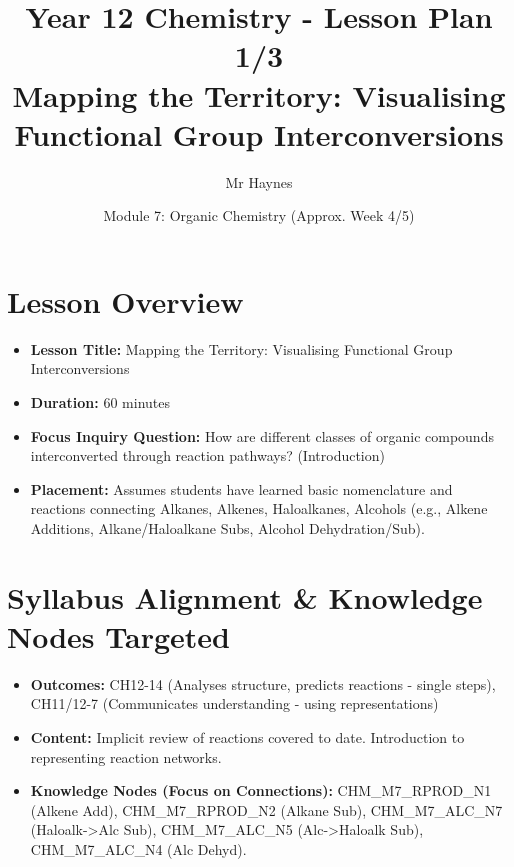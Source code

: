 \documentclass[11pt, a4paper]{article}
\title{Year 12 Chemistry - Lesson Plan 1/3 \\ Mapping the Territory: Visualising Functional Group Interconversions}
\date{Module 7: Organic Chemistry (Approx. Week 4/5)}
\author{Mr Haynes} %
\begin{document}
\maketitle
\vspace{-2em} %

\section*{Lesson Overview}
\begin{itemize}
    \item \textbf{Lesson Title:} Mapping the Territory: Visualising Functional Group Interconversions
    \item \textbf{Duration:} 60 minutes
    \item \textbf{Focus Inquiry Question:} How are different classes of organic compounds interconverted through reaction pathways? (Introduction)
    \item \textbf{Placement:} Assumes students have learned basic nomenclature and reactions connecting Alkanes, Alkenes, Haloalkanes, Alcohols (e.g., Alkene Additions, Alkane/Haloalkane Subs, Alcohol Dehydration/Sub).
\end{itemize}

\section*{Syllabus Alignment \& Knowledge Nodes Targeted}
\begin{itemize}
    \item \textbf{Outcomes:} CH12-14 (Analyses structure, predicts reactions - single steps), CH11/12-7 (Communicates understanding - using representations)
    \item \textbf{Content:} Implicit review of reactions covered to date. Introduction to representing reaction networks.
    \item \textbf{Knowledge Nodes (Focus on Connections):} CHM\_M7\_RPROD\_N1 (Alkene Add), CHM\_M7\_RPROD\_N2 (Alkane Sub), CHM\_M7\_ALC\_N7 (Haloalk->Alc Sub), CHM\_M7\_ALC\_N5 (Alc->Haloalk Sub), CHM\_M7\_ALC\_N4 (Alc Dehyd).
\end{itemize}
\end{document}
